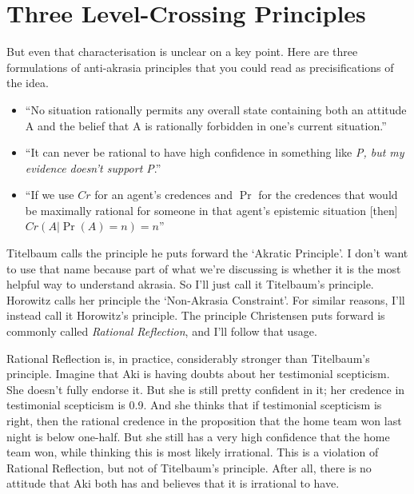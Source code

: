 \section{Three Level-Crossing Principles}
\label{threelevel-crossingprinciples}

But even that characterisation is unclear on a key point. Here are three formulations of anti-akrasia principles that you could read as precisifications of the idea.

\begin{itemize}
\item{} ``No situation rationally permits any overall state containing both an attitude A and the belief that A is rationally forbidden in one's current situation.'' ~\citep[261]{Titelbaum2015}

\item{} ``It can never be rational to have high confidence in something like \emph{P, but my evidence doesn't support P}.'' ~\citep[718]{Horowitz2014}

\item{} ``If we use $Cr$ for an agent's credences and $\Pr$ for the credences that would be maximally rational for someone in that agent's epistemic situation [then] $Cr(A | \Pr(A) = n) = n$'' ~\citep[122]{Christensen2010b}

\end{itemize}
Titelbaum calls the principle he puts forward the `Akratic Principle'. I don't want to use that name because part of what we're discussing is whether it is the most helpful way to understand akrasia. So I'll just call it Titelbaum's principle. Horowitz calls her principle the `Non-Akrasia Constraint'. For similar reasons, I'll instead call it Horowitz's principle. The principle Christensen puts forward is commonly called \emph{Rational Reflection}, and I'll follow that usage.

Rational Reflection is, in practice, considerably stronger than Titelbaum's principle. Imagine that \gls{Aki} is having doubts about her testimonial scepticism. She doesn't fully endorse it. But she is still pretty confident in it; her credence in testimonial scepticism is 0.9. And she thinks that if testimonial scepticism is right, then the rational credence in the proposition that the home team won last night is below one-half. But she still has a very high confidence that the home team won, while thinking this is most likely irrational. This is a violation of Rational Reflection, but not of Titelbaum's principle. After all, there is no attitude that \gls{Aki} both has and believes that it is irrational to have.


